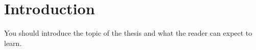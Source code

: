 \chapter{Introduction}
\label{ch:intro}
You should introduce the topic of the thesis and what the reader can expect to learn.